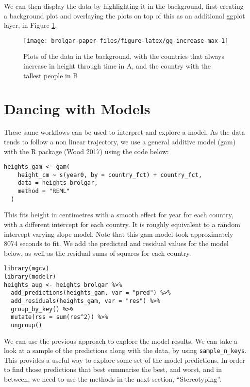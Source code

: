 We can then display the data by highlighting it in the background, first creating a background plot and overlaying the plots on top of this as an additional ggplot layer, in Figure
\ref{fig:gg-increase-max}.

\begin{figure}

{\centering \texttt{[image: brolgar-paper\_files/figure-latex/gg-increase-max-1]} 

}

\caption{Plots of the data in the background, with the countries that always increase in height through time in A, and the country with the tallest people in B}\label{fig:gg-increase-max}
\end{figure}

\hypertarget{dancing-with-models}{%
\section{Dancing with Models}\label{dancing-with-models}}

These same workflows can be used to interpret and explore a model. As the data tends to follow a non linear trajectory, we use a general additive model (gam) with the  R package (Wood 2017) using the code below:

\begin{verbatim}
heights_gam <- gam(
    height_cm ~ s(year0, by = country_fct) + country_fct,
    data = heights_brolgar,
    method = "REML"
  )
\end{verbatim}

This fits height in centimetres with a smooth effect for year for each country, with a different intercept for each country. It is roughly equivalent to a random intercept varying slope model. Note that this gam model took approximately 8074 seconds to fit. We add the predicted and residual values for the model below, as well as the residual sums of squares for each country.

\begin{verbatim}
library(mgcv)
library(modelr)
heights_aug <- heights_brolgar %>%
  add_predictions(heights_gam, var = "pred") %>%
  add_residuals(heights_gam, var = "res") %>% 
  group_by_key() %>% 
  mutate(rss = sum(res^2)) %>% 
  ungroup()
\end{verbatim}

We can use the previous approach to explore the model results. We can take a look at a sample of the predictions along with the data, by using \texttt{sample\_n\_keys}. This provides a useful way to explore some set of the model predictions. In order to find those predictions that best summarise the best, and worst, and in between, we need to use the methods in the next section, ``Stereotyping''.

